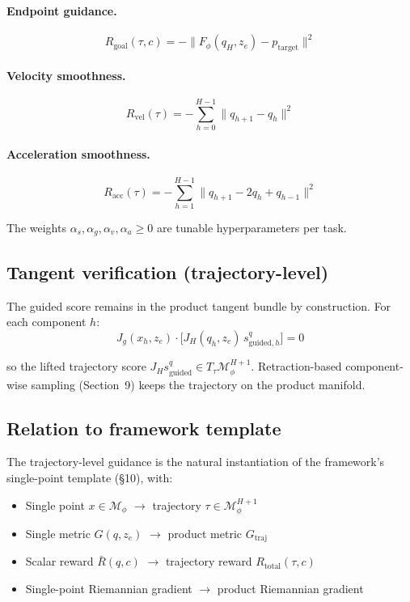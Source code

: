 \documentclass[11pt,a4paper]{article}
\newcommand{\Mphi}{\mathcal{M}_{\phi}}
\begin{document}
\paragraph{Endpoint guidance.}
\begin{equation}
R_{\text{goal}}(\tau, c) = -\| F_\phi(q_H, z_e) - p_{\text{target}} \|^2
\end{equation}

\paragraph{Velocity smoothness.}
\begin{equation}
R_{\text{vel}}(\tau) = -\sum_{h=0}^{H-1} \| q_{h+1} - q_h \|^2
\end{equation}

\paragraph{Acceleration smoothness.}
\begin{equation}
R_{\text{acc}}(\tau) = -\sum_{h=1}^{H-1} \| q_{h+1} - 2 q_h + q_{h-1} \|^2
\end{equation}

The weights $\alpha_s, \alpha_g, \alpha_v, \alpha_a \geq 0$ are tunable hyperparameters per task.

\subsection{Tangent verification (trajectory-level)}

The guided score remains in the product tangent bundle by construction. For each component $h$:
\begin{equation}
J_g(x_h, z_e) \cdot \bigl[ J_H(q_h, z_e) \, s_{\text{guided}, h}^q \bigr] = 0
\end{equation}

so the lifted trajectory score $J_H s_{\text{guided}}^q \in T_\tau \Mphi^{H+1}$. Retraction-based component-wise sampling (Section~9) keeps the trajectory on the product manifold.

\subsection{Relation to framework template}

The trajectory-level guidance is the natural instantiation of the framework's single-point template (\S 10), with:
\begin{itemize}[noitemsep]
    \item Single point $x \in \Mphi$ $\to$ trajectory $\tau \in \Mphi^{H+1}$
    \item Single metric $G(q, z_e)$ $\to$ product metric $G_{\text{traj}}$
    \item Scalar reward $\bar R(q, c)$ $\to$ trajectory reward $R_{\text{total}}(\tau, c)$
    \item Single-point Riemannian gradient $\to$ product Riemannian gradient
\end{itemize}
\end{document}
